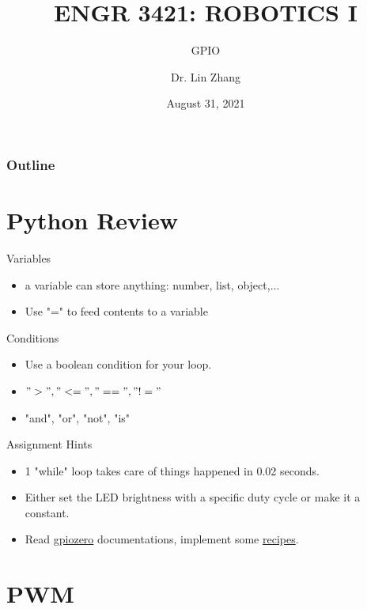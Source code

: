 \documentclass[12pt,letterpaper]{beamer}
\title[Robotics I]
{ENGR 3421: ROBOTICS I}
\subtitle{GPIO}
\author[Zhang, Lin]
{Dr. Lin Zhang}
\institute[UCA] %
{
  Department of Physics and Astronomy\\
  University of Central Arkansas
}
\date[Robotics1 2021] %
{August 31, 2021}
\begin{document}
\frame{\titlepage}

\begin{frame}
\frametitle{Outline}
\tableofcontents
\end{frame}


\section{Python Review}

\begin{frame}{Variables}
    \begin{itemize}
        \item a variable can store anything: number, list, object,...
        \item Use "=" to feed contents to a variable
    \end{itemize}
\end{frame}

\begin{frame}{Conditions}
    \begin{itemize}
        \item Use a boolean condition for your loop.
        \item $">", "<=", "==", "!="$ 
        \item "and", "or", "not", "is"
    \end{itemize}
\end{frame}

\begin{frame}{Assignment Hints}
    \begin{itemize}
        \item 1 "while" loop takes care of things happened in 0.02 seconds.
        \item Either set the LED brightness with a specific duty cycle or make it a constant.
        \item Read \href{https://gpiozero.readthedocs.io/en/stable/}{gpiozero} documentations, implement some \href{https://gpiozero.readthedocs.io/en/stable/recipes.html}{recipes}.
    \end{itemize}
\end{frame}

\section{PWM}
\end{document}
